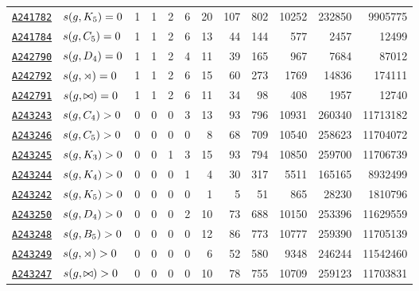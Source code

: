 \documentclass[12pt]{article}
\newcommand{\OEIS}[1]
{\href{https://oeis.org/#1}{\texttt{#1}}}
\begin{document}
\begin{appendices}
\begin{longtable}{ l l r r r r r r r r r r}
\OEIS{A241782} & $s{}(g,K_5) =0$ & 1 & 1 & 2 & 6 & 20 & 107 & 802 & 10252 & 232850 & 9905775 \\
\OEIS{A241784} & $s{}(g,C_5) =0$ & 1 & 1 & 2 & 6 & 13 & 44 & 144 & 577 & 2457 & 12499 \\
\OEIS{A242790} & $s{}(g,D_4) =0$ & 1 & 1 & 2 & 4 & 11 & 39 & 165 & 967 & 7684 & 87012 \\
\OEIS{A242792} & $s{}(g,\rtimes) =0$ & 1 & 1 & 2 & 6 & 15 & 60 & 273 & 1769 & 14836 & 174111 \\
\OEIS{A242791} & $s{}(g,\bowtie) =0$ & 1 & 1 & 2 & 6 & 11 & 34 & 98 & 408 & 1957 & 12740 \\

\OEIS{A243243} & $s{}(g,C_4) >0$ & 0 & 0 & 0 & 3 & 13 & 93 & 796 & 10931 & 260340 & 11713182 \\
\OEIS{A243246} & $s{}(g,C_5) >0$ & 0 & 0 & 0 & 0 & 8 & 68 & 709 & 10540 & 258623 & 11704072 \\
\OEIS{A243245} & $s{}(g,K_3) >0$ & 0 & 0 & 1 & 3 & 15 & 93 & 794 & 10850 & 259700 & 11706739 \\
\OEIS{A243244} & $s{}(g,K_4) >0$ & 0 & 0 & 0 & 1 & 4 & 30 & 317 & 5511 & 165165 & 8932499 \\
\OEIS{A243242} & $s{}(g,K_5) >0$ & 0 & 0 & 0 & 0 & 1 & 5 & 51 & 865 & 28230 & 1810796 \\
\OEIS{A243250} & $s{}(g,D_4) >0$ & 0 & 0 & 0 & 2 & 10 & 73 & 688 & 10150 & 253396 & 11629559 \\
\OEIS{A243248} & $s{}(g,B_5) >0$ & 0 & 0 & 0 & 0 & 12 & 86 & 773 & 10777 & 259390 & 11705139 \\
\OEIS{A243249} & $s{}(g,\rtimes) >0$ & 0 & 0 & 0 & 0 & 6 & 52 & 580 & 9348 & 246244 & 11542460 \\
\OEIS{A243247} & $s{}(g,\bowtie) >0$ & 0 & 0 & 0 & 0 & 10 & 78 & 755 & 10709 & 259123 & 11703831 \\


\end{longtable}
\end{appendices}
\end{document}
